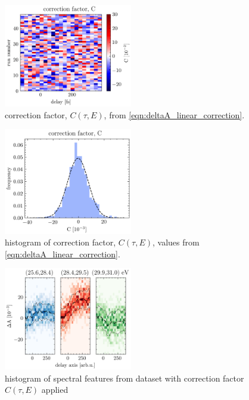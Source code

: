 \begin{figure}
	\centering
	\includegraphics[width=0.5\textwidth]{figures/chap3/C_factor_image.png}
	\caption{correction factor, $C(\tau,E)$, from \cref{eqn:deltaA_linear_correction}.}
	\label{fig:C_factor_image}
\end{figure}

\begin{figure}
	\centering
	\includegraphics[width=0.5\textwidth]{figures/chap3/C_factor_hist.png}
	\caption{histogram of correction factor, $C(\tau,E)$, values from \cref{eqn:deltaA_linear_correction}.}
	\label{fig:C_factor_hist}
\end{figure}

\begin{figure}
	\centering
	\includegraphics[width=0.5\textwidth]{figures/chap3/corrected_hist.png}
	\caption{histogram of spectral features from dataset with correction factor $C(\tau,E)$ applied }
	\label{fig:corrected_hist}
\end{figure}

